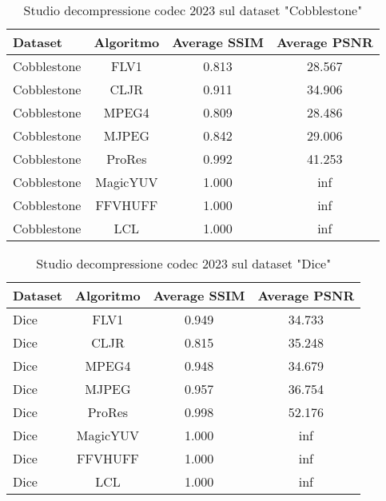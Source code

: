 \begin{table}[ht]
\centering
\begin{tabular}{|l|c|c|c|}
\hline
Dataset               & Algoritmo & Average SSIM & Average PSNR
\\ \hline
Cobblestone           & FLV1      & 0.813        & 28.567       \\ \hline
Cobblestone           & CLJR      & 0.911        & 34.906       \\ \hline
Cobblestone           & MPEG4     & 0.809        & 28.486       \\ \hline
Cobblestone           & MJPEG     & 0.842        & 29.006       \\ \hline
Cobblestone           & ProRes    & 0.992        & 41.253       \\ \hline
Cobblestone           & MagicYUV  & 1.000        & inf          \\ \hline
Cobblestone           & FFVHUFF   & 1.000        & inf          \\ \hline
Cobblestone           & LCL       & 1.000        & inf          \\ \hline
\end{tabular}
\caption{Studio decompressione codec 2023 sul dataset  "Cobblestone"}
\end{table}

\begin{table}[!ht]
\centering
\begin{tabular}{|l|c|c|c|}
\hline
Dataset               & Algoritmo & Average SSIM & Average PSNR
\\ \hline
Dice                  & FLV1      & 0.949        & 34.733       \\ \hline
Dice                  & CLJR      & 0.815        & 35.248       \\ \hline
Dice                  & MPEG4     & 0.948        & 34.679       \\ \hline
Dice                  & MJPEG     & 0.957        & 36.754       \\ \hline
Dice                  & ProRes    & 0.998        & 52.176       \\ \hline
Dice                  & MagicYUV  & 1.000        & inf          \\ \hline
Dice                  & FFVHUFF   & 1.000        & inf          \\ \hline
Dice                  & LCL       & 1.000        & inf          \\ \hline
\end{tabular}
\caption{Studio decompressione codec 2023 sul dataset  "Dice"}
\end{table}

